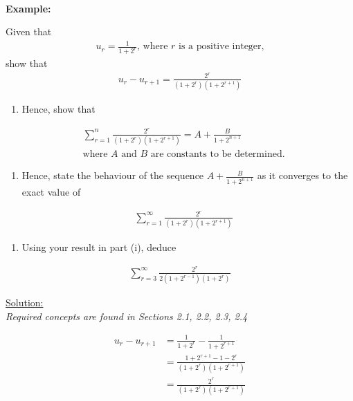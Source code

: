 \documentclass[12pt, a4paper, titlepage]{article}
\begin{document}
\textbf{\\ Example:}

Given that
\begin{align*}
    u_r = \frac{1}{1 + 2^r} \text{, where $r$ is a positive integer,}
\end{align*}
show that
\begin{align*}
    u_r - u_{r + 1} = \frac{2^r}{(1 + 2^r)(1 + 2^{r + 1})}
\end{align*}
\begin{enumerate}[label=(\roman*)]
    \item Hence, show that
\end{enumerate}
\begin{align*}
    &\sum_{r = 1}^n \frac{2^r}{(1 + 2^r)(1 + 2^{r + 1})} = A + \frac{B}{1 + 2^{n + 1}} \\
    &\text{where $A$ and $B$ are constants to be determined.}
\end{align*}
\begin{enumerate}[resume, label=(\roman*)]
    \item Hence, state the behaviour of the sequence $A + \frac{B}{1 + 2^{n + 1}}$ as it converges to the exact value of 
\end{enumerate}
\begin{align*}
    &\sum_{r = 1}^\infty \frac{2^r}{(1 + 2^r)(1 + 2^{r + 1})}
\end{align*}
\begin{enumerate}[resume, label=(\roman*)]
    \item Using your result in part (i), deduce
\end{enumerate}
\begin{align*}
    \sum_{r = 3}^\infty \frac{2^r}{2(1 + 2^{r - 1})(1 + 2^r)}
\end{align*}

\begin{flushright}
\end{flushright}

\underline{Solution:} \\
\emph{Required concepts are found in Sections 2.1, 2.2, 2.3, 2.4}

\begin{align*}
    u_r - u_{r + 1} &= \frac{1}{1 + 2^r} - \frac{1}{1 + 2^{r + 1}} \\
    &= \frac{1 + 2^{r + 1} - 1 - 2^r}{(1 + 2^r)(1 + 2^{r + 1})} \\
    &= \frac{2^r}{(1 + 2^r)(1 + 2^{r + 1})}
\end{align*}
\end{document}
